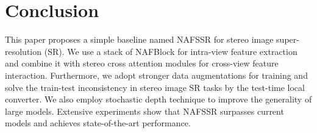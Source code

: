 \documentclass[10pt,twocolumn,letterpaper]{article}
\begin{document}
%
 \section{Conclusion}
This paper proposes a simple baseline named NAFSSR for stereo image super-resolution (SR). 
We use a stack of NAFBlock for intra-view feature extraction and combine it with stereo cross attention modules for cross-view feature interaction. Furthermore, we adopt stronger data augmentations for training and solve the train-test inconsistency in stereo image SR tasks by the test-time local converter.
We also employ stochastic depth technique to improve the generality of large models. 
Extensive experiments show that NAFSSR surpasses current models and achieves state-of-the-art performance. 
\end{document}
